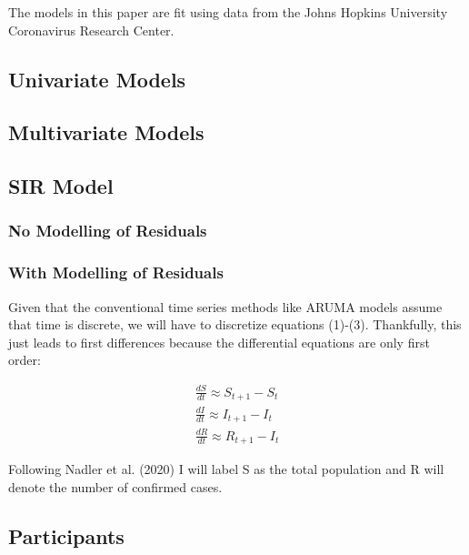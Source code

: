 \documentclass[
  english,
  doc]{apa6}
\begin{document}
The models in this paper are fit using data from the Johns Hopkins University
Coronavirus Research Center.

\hypertarget{univariate-models}{%
\subsection{Univariate Models}\label{univariate-models}}

\hypertarget{multivariate-models}{%
\subsection{Multivariate Models}\label{multivariate-models}}

\hypertarget{sir-model}{%
\subsection{SIR Model}\label{sir-model}}

\hypertarget{no-modelling-of-residuals}{%
\subsubsection{No Modelling of Residuals}\label{no-modelling-of-residuals}}

\hypertarget{with-modelling-of-residuals}{%
\subsubsection{With Modelling of Residuals}\label{with-modelling-of-residuals}}

Given that the conventional time series methods like ARUMA models assume that
time is discrete, we will have to discretize equations (1)-(3). Thankfully, this
just leads to first differences because the differential equations are only
first order:

\begin{align}
  \frac{dS}{dt} \approx S_{t+1} - S_{t} \\
  \frac{dI}{dt} \approx I_{t+1} - I_{t} \\
  \frac{dR}{dt} \approx R_{t+1} - I_{t}
\end{align}

Following Nadler et al. (2020) I will label S as the total population and R will denote the
number of confirmed cases.

\hypertarget{participants}{%
\subsection{Participants}\label{participants}}
\end{document}

